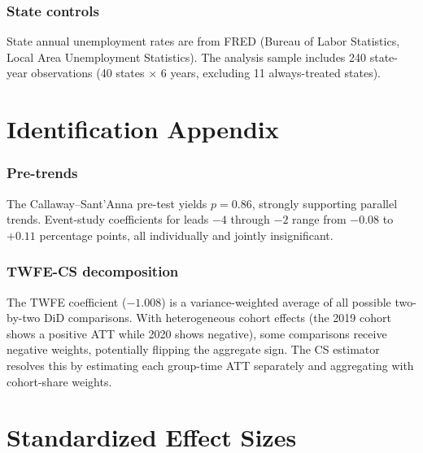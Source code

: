 \documentclass[12pt]{article}
\begin{document}
\subsubsection*{State controls} State annual unemployment rates are from FRED (Bureau of Labor Statistics, Local Area Unemployment Statistics). The analysis sample includes 240 state-year observations (40 states $\times$ 6 years, excluding 11 always-treated states).

\section{Identification Appendix}

\subsubsection*{Pre-trends} The Callaway--Sant'Anna pre-test yields $p = 0.86$, strongly supporting parallel trends. Event-study coefficients for leads $-4$ through $-2$ range from $-0.08$ to $+0.11$ percentage points, all individually and jointly insignificant.

\subsubsection*{TWFE-CS decomposition} The TWFE coefficient ($-1.008$) is a variance-weighted average of all possible two-by-two DiD comparisons. With heterogeneous cohort effects (the 2019 cohort shows a positive ATT while 2020 shows negative), some comparisons receive negative weights, potentially flipping the aggregate sign. The CS estimator resolves this by estimating each group-time ATT separately and aggregating with cohort-share weights.

\section{Standardized Effect Sizes}
\label{sec:sde}


\end{document}

